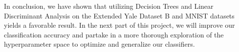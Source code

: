 In conclusion, we have shown that utilizing Decision Trees and Linear Discriminant Analysis on the Extended Yale Dataset B and MNIST datasets yields a favorable result. In the next part of this project, we will improve our classification accuracy and partake in a more thorough exploration of the hyperparameter space to optimize and generalize our classifiers. 